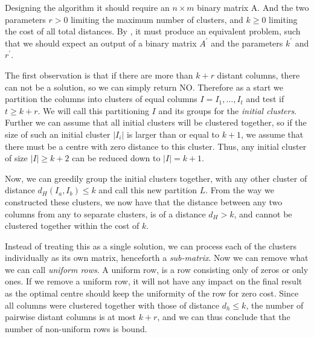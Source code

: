 \documentclass[a4paper]{article}
\begin{document}
Designing the algorithm it should require an $n \times m$ binary matrix A. And the two parameters $r > 0$ limiting the
maximum number of clusters, and $k \geq 0$ limiting the cost of all total distances. By , it must 
produce an equivalent problem, such that we should expect an output of a binary matrix $A^\prime$ and the parameters $k^\prime$
and $r^\prime$.

The first observation is that if there are more than $k+r$ distant columns, there can not be a solution, so we can simply return NO. 
Therefore as a start we partition the columns into clusters of equal columns $I = {I_1, \dots, I_t}$ and test if $t \ge k+r$. 
We will call this partitioning $I$ and its groups for the \textit{initial clusters}. Further we can assume that all initial 
clusters will be clustered together, so if the size of such an initial cluster $|I_i|$ is larger than or equal to $k+1$, 
we assume that there must be a centre with zero distance to this cluster. Thus, any initial cluster of size $|I| \geq k+2$
can be reduced down to $|I| = k+1$.

Now, we can greedily group the initial clusters together, with any other cluster of distance $d_H(I_a,I_b) \leq k$ and call this new 
partition $L$. From the way we constructed these clusters, we now have that the distance between any two columns from any to separate 
clusters, is of a distance $d_H > k$, and cannot be clustered together within the cost of $k$.

Instead of treating this as a single solution, we can process each of the clusters individually as its own matrix, henceforth
a \textit{sub-matrix}. Now we can remove what we can call \textit{uniform rows}. A uniform row, is a row consisting 
only of zeros or only ones. If we remove a uniform row, it will not have any impact on the final result as the optimal centre
should keep the uniformity of the row for zero cost. Since all columns were clustered together with those of distance $d_h \leq k$, 
the number of pairwise distant columns is at most $k+r$, and we can thus conclude that the number of non-uniform rows is bound.
\end{document}
